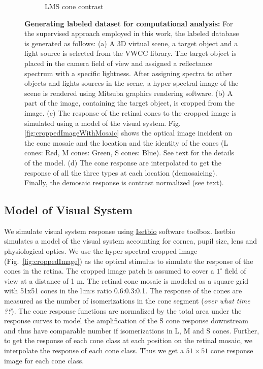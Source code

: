 \documentclass{jov}
\begin{document}
\begin{figure}
\begin{subfigure}[b]{0.2 \textwidth}
        \caption{LMS cone contrast}
        \label{fig:coneContrast}
    \end{subfigure}
    \label{fig:sceneWithCroppedImage}
    \caption{{\bf Generating labeled dataset for computational analysis:}  For the supervised approach employed in this work, the labeled database is generated as follows: (a) A 3D virtual scene, a target object and a light source is selected from the VWCC library. The target object is placed in the camera field of view and assigned a reflectance spectrum with a specific lightness. After assigning spectra to other objects and lights sources in the scene, a hyper-spectral image of the scene is rendered using Mitsuba graphics rendering software. (b) A part of the image, containing the target object, is cropped from the image. (c) The response of the retinal cones to the cropped image is simulated using a model of the visual system. Fig.\ref{fig:croppedImageWithMosaic} shows the optical image incident on the cone mosaic and the location and the identity of the cones (L cones: Red, M cones: Green, S cones: Blue). See text for the details of the model. (d) The cone response are interpolated to get the response of all the three types at each location (demosaicing). Finally, the demosaic response is contrast normalized (see text).}
\end{figure}

\subsection{Model of Visual System} \label{method:Isetbio}
We simulate visual system response using \href{http://isetbio.org}{Isetbio} software toolbox. Isetbio simulates a model of the visual system accounting for cornea, pupil size, lens and physiological optics. We use the hyper-spectral cropped image (Fig.~\ref{fig:croppedImage}) as the optical stimulus to simulate the response of the cones in the retina. The cropped image patch is assumed to cover a $1^{\circ}$ field of view at a distance of 1 m. The retinal cone mosaic is modeled as a square grid with 51x51 cones in the l:m:s ratio 0.6:0.3:0.1. The response of the cones are measured as the number of isomerizations in the cone segment ({\it over what time ??}). The cone response functions are normalized by the total area under the response curves to model the amplification of the S cone response downstream and thus have comparable number if isomerizations in L, M and S cones. Further, to get the response of each cone class at each position on the retinal mosaic, we interpolate the response of each cone class. Thus we get a $51 \times 51$ cone response image for each cone class.
\end{document}
